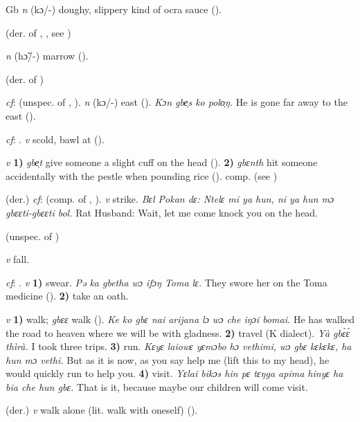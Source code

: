 \begin{letter}{Gb}
 \textit{n} (kɔ/-) doughy, slippery kind of ocra sauce (\citealt{Pichl1967}).

 (der. of , , see ) 

 \textit{n} (hɔ̃/-) marrow (\citealt{Pichl1967}). 

 (der. of ) 

 \textit{cf}:  (unspec. of , ). \textit{n} (kɔ/-) east (\citealt{Pichl1967}). \textit{Kɔn gbe̹s ko polo̹ŋ.} He is gone far away to the east (\citealt{Pichl1967}). 

 \textit{cf}: . \textit{v} scold, bawl at (\citealt{Pichl1967}). 

 \textit{v} \textbf{1)} \textit{gbe̹t} give someone a slight cuff on the head (\citealt{Pichl1967}). \textbf{2)} \textit{gbɛnth} hit someone accidentally with the pestle when pounding rice (\citealt{Pichl1967}). comp.  (see ) 

 (der.) \textit{cf}:  (comp. of , ). \textit{v} strike. \textit{Bɛl Pokan dɛ: Ntelɛ mi ya hun, ni ya hun mɔ gbɛɛti-gbɛɛti bol.} Rat Husband: Wait, let me come knock you on the head.

 (unspec. of ) 

 \textit{v} fall.

 \textit{cf}: . \textit{v} \textbf{1)} swear. \textit{Pə ka gbetha wɔ ifɔŋ Toma lɛ.} They swore her on the Toma medicine (\citealt{Pichl1967}). \textbf{2)} take an oath.

 \textit{v} \textbf{1)} walk; \textit{gbɛɛ} walk (\citealt{Pichl1967}). \textit{Ke ko gbɛ nai arijana lɔ wɔ che iŋɔi bomai.} He has walked the road to heaven where we will be with gladness. \textbf{2)} travel (K dialect). \textit{Yà gbɛ̀ɛ́ thìrà.} I took three trips. \textbf{3)} run. \textit{Kɛyɛ laiowɛ yɛmɔbo hɔ vethimi, wɔ gbɛ kɛkɛkɛ, ha hun mɔ vethi.} But as it is now, as you say help me (lift this to my head), he would quickly run to help you. \textbf{4)} visit. \textit{Yɛlai bikɔs hin pɛ tɛŋga apima hinyɛ ha bia che hun gbɛ.} That is it, because maybe our children will come visit.

 (der.) \textit{v} walk alone (lit. walk with oneself) (\citealt{Pichl1967}). 


\end{letter}
